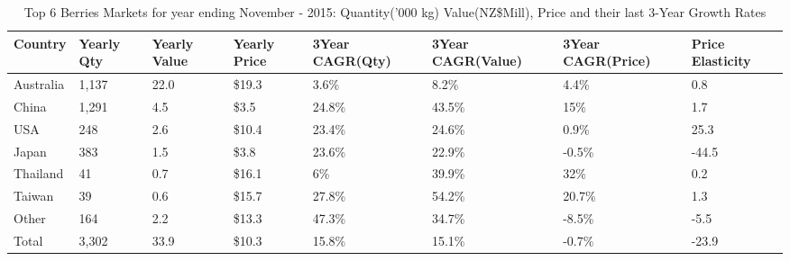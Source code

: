\begin{table}[ht]
\centering
{\scriptsize
\begin{tabular}[t]{p{1.8cm}>{\hfill}p{1.4cm}>{\hfill}p{1.4cm}>{\hfill}p{1.6cm}>{\hfill}p{1.9cm}>{\hfill}p{2cm}>{\hfill}p{1.9cm}>{\hfill}p{1.5cm}}
 \textbf{Country} & \textbf{Yearly Qty} & \textbf{Yearly Value} & \textbf{Yearly Price} & \textbf{3Year CAGR(Qty)} & \textbf{3Year CAGR(Value)} & \textbf{3Year CAGR(Price)} & \textbf{Price Elasticity} \\
\hline
Australia & 1,137 & 22.0 & \$19.3 & 3.6\% & 8.2\% & 4.4\% & 0.8 \\  
China & 1,291 & 4.5 & \$3.5 & 24.8\% & 43.5\% & 15\% & 1.7 \\  
USA & 248 & 2.6 & \$10.4 & 23.4\% & 24.6\% & 0.9\% & 25.3 \\  
Japan & 383 & 1.5 & \$3.8 & 23.6\% & 22.9\% & -0.5\% & -44.5 \\  
Thailand & 41 & 0.7 & \$16.1 & 6\% & 39.9\% & 32\% & 0.2 \\  
Taiwan & 39 & 0.6 & \$15.7 & 27.8\% & 54.2\% & 20.7\% & 1.3 \\  
Other & 164 & 2.2 & \$13.3 & 47.3\% & 34.7\% & -8.5\% & -5.5 \\  
Total & 3,302 & 33.9 & \$10.3 & 15.8\% & 15.1\% & -0.7\% & -23.9 \\  
\hline
\end{tabular}
}
\caption{\scriptsize Top 6 Berries Markets for year ending November - 2015: Quantity('000 kg) Value(NZ\$Mill), Price and their last 3-Year Growth Rates}
\end{table}

